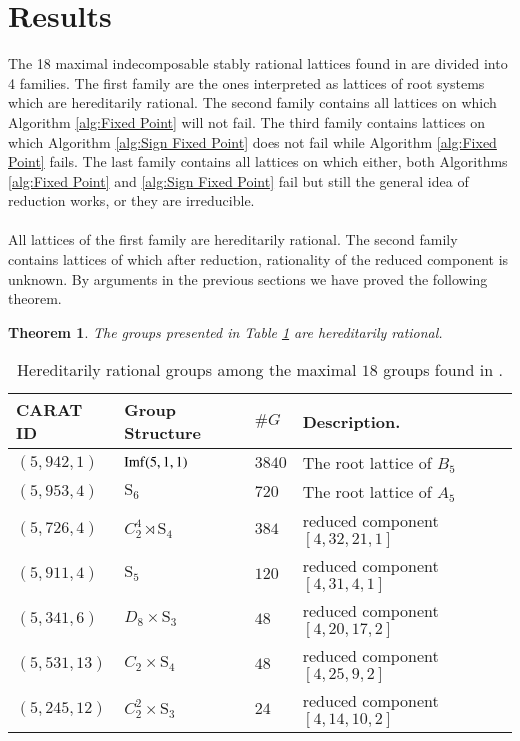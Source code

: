 \documentclass{article}
\theoremstyle{plain}
\newtheorem{theorem}{Theorem}
\theoremstyle{definition}
\begin{document}
\section{Results}\label{conc}
The 18 maximal indecomposable stably rational lattices found in \cite{Hoshi} are divided into 4 families. The first family are the ones interpreted as lattices of root systems which are hereditarily rational. The second family contains all lattices on which Algorithm \ref{alg:Fixed Point} will not fail. The third family contains lattices on which  Algorithm \ref{alg:Sign Fixed Point} does not fail while Algorithm \ref{alg:Fixed Point} fails. The last family contains all lattices on which either, both Algorithms \ref{alg:Fixed Point} and \ref{alg:Sign Fixed Point} fail but still the general idea of reduction works, or they are irreducible.\\
\\
All lattices of the first family are hereditarily rational. The second family contains lattices of which after reduction, rationality of the reduced component is unknown. By arguments in the previous sections we have proved the following theorem.
\begin{theorem}
The groups presented in Table \ref{Tbl:Rational} are hereditarily rational.
\end{theorem}
 \begin{table}[H]  
\centering
\begin{tabular}{lllll}
CARAT ID & Group Structure & $\#G$ & Description.\\\hline
$(5,942,1)$ & ${\rm Imf}(5,1,1)$ & $3840$ & The root lattice of $B_5$ \\
 $(5,953,4)$ & $\mathrm{S}_6$ & $720$ &  The root lattice of $A_5$ \\
 $(5,726,4)$ & $C_2^4\rtimes \mathrm{S}_4$ & $384$   & reduced component $[4,32,21,1]$  \\
$(5,911,4)$ & $\mathrm{S}_5$ & $120$  & reduced component $[ 4, 31, 4, 1 ]$  \\
 $(5,341,6)$ & $D_8\times \mathrm{S}_3$ & $48$  & reduced component $[ 4, 20, 17, 2 ]$ &\\
 $(5,531,13)$ & $C_2\times \mathrm{S}_4$ & $48$  & reduced component $[ 4, 25, 9, 2 ]$ &\\
 $(5,245,12)$ & $C_2^2\times \mathrm{S}_3$ & $24$ &reduced component $[ 4, 14, 10, 2 ]$&
\end{tabular}
\caption{Hereditarily rational groups among the maximal $18$ groups 
found in \cite{Hoshi}.}
\label{Tbl:Rational}
\end{table}
\end{document}
